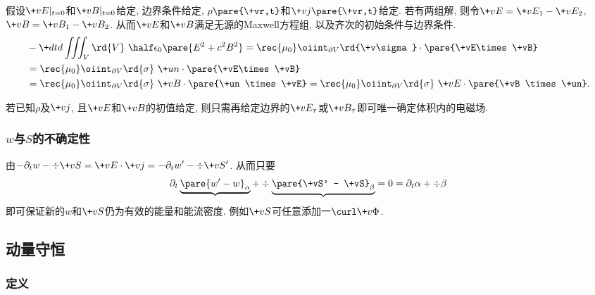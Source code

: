 \documentclass[hidelinks]{ctexart}
\begin{document}
假设$\+vE\vert_{t=0}$和$\+vB\vert_{t=0}$给定, 边界条件给定, $\rho\pare{\+vr,t}$和$\+vj\pare{\+vr,t}$给定. 若有两组解, 则令$\+vE = \+vE_1 - \+vE_2$, $\+vB = \+vB_1 - \+vB_2$. 从而$\+vE$和$\+vB$满足无源的Maxwell方程组, 以及齐次的初始条件与边界条件.
\begin{align*}
    & -\+dtd{} \iiint_V \rd{V}\ \half \epsilon_0 \pare{E^2 + c^2B^2} = \rec{\mu_0}\oiint_{\partial V}\rd{\+v\sigma}\cdot \pare{\+vE\times \+vB}\\
    &= \rec{\mu_0}\oiint_{\partial V}\rd{\sigma}\ \+un \cdot \pare{\+vE\times \+vB} \\
    &= \rec{\mu_0}\oiint_{\partial V}\rd{\sigma}\ \+vB \cdot \pare{\+un \times \+vE} = \rec{\mu_0}\oiint_{\partial V}\rd{\sigma}\ \+vE \cdot \pare{\+vB \times \+un}.
\end{align*}
\begin{theorem}
    若已知$\rho$及$\+vj$, 且$\+vE$和$\+vB$的初值给定, 则只需再给定边界的$\+vE_\tau$或$\+vB_\tau$即可唯一确定体积内的电磁场.
\end{theorem}


\subsubsection{\texorpdfstring{$w$}{w}与\texorpdfstring{$S$}{S}的不确定性} %
\label{ssub:w与s的不确定性}

由$\displaystyle -\partial_t w - \div \+vS = \+vE\cdot \+vj = -\partial_t w' - \div \+vS'$. 从而只要
\[ \partial_t \underbrace{\pare{w' - w}_\alpha} + \div \underbrace{\pare{\+vS' - \+vS}_\beta} = 0 = \partial_t \alpha + \div \beta \]
即可保证新的$w$和$\+vS$仍为有效的能量和能流密度. 例如$\+vS$可任意添加一$\curl \+v\Phi$.



\subsection{动量守恒} %
\label{sub:动量守恒}

\subsubsection{定义} %
\label{ssub:定义}
\end{document}
